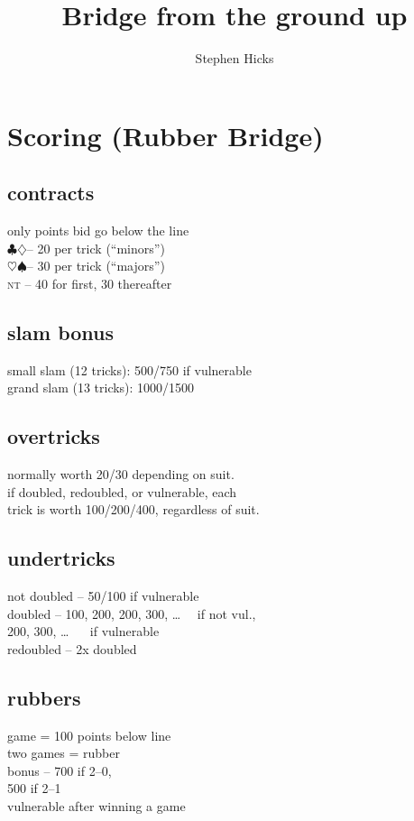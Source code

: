 \documentclass[landscape]{article}
\newcommand{\optionalmath}[1]{\ifmmode#1\else$#1$\fi}
\def\C{\optionalmath\clubsuit}
\def\D{\optionalmath\diamondsuit}
\def\H{\optionalmath\heartsuit}
\def\S{\optionalmath\spadesuit}
\def\NT{\ifmmode\mathsc{nt}\else\textsc{nt}\fi}
\begin{document}
\title{Bridge from the ground up}
\author{Stephen Hicks}

\begin{minipage}[t]{0.33\columnwidth}
\section{Scoring (Rubber Bridge)}
\subsection{contracts}
only points bid go below the line\\
\C \D -- 20 per trick (``minors'')\\
\H \S -- 30 per trick (``majors'')\\
\NT\kern3.5pt -- 40 for first, 30 thereafter

\subsection{slam bonus}
small slam (12 tricks): 500/750 if vulnerable\\
grand slam (13 tricks): 1000/1500

\subsection{overtricks}
normally worth 20/30 depending on suit.\\
if doubled, redoubled, or vulnerable, each\\
\phantom{m}trick is worth 100/200/400, regardless of suit.

\subsection{undertricks}
not doubled -- 50/100 if vulnerable\\
doubled -- 100, 200, 200, 300, \ldots $\quad$ if not vul.,\\
\phantom{doubled -- }200, 300, \ldots\phantom{,100, 200} $\quad$ if vulnerable\\
redoubled -- 2x doubled

\subsection{rubbers}
game = 100 points below line\\
two games = rubber\\
bonus -- 700 if 2--0,\\
\phantom{bonus -- }500 if 2--1\\
vulnerable after winning a game

\end{minipage}
\end{document}
